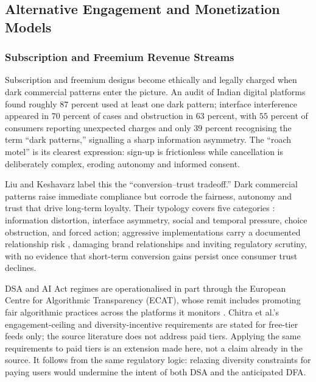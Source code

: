 \documentclass[11pt]{article}
\begin{document}
\subsection{Alternative Engagement and Monetization Models}

\subsubsection{Subscription and Freemium Revenue Streams}
\label{sec:subscription_freemium_streams} Subscription and freemium designs become ethically and legally charged when dark commercial patterns enter the picture. An audit of Indian digital platforms found \parencites[2]{6295677} roughly $87$ percent used at least one dark pattern; interface interference appeared in $70$ percent of cases and obstruction in $63$ percent, with $55$ percent of consumers reporting unexpected charges and only $39$ percent recognising the term ``dark patterns,'' signalling a sharp information asymmetry. The ``roach motel'' is its clearest expression: sign-up is frictionless \parencites[4]{6295677} while cancellation is deliberately complex, eroding autonomy and informed consent.

Liu and Keshavarz label this the ``conversion--trust tradeoff.'' Dark commercial patterns raise immediate compliance but corrode the fairness, autonomy and trust that drive long-term loyalty. Their typology covers five categories \parencites[33]{6087241}: information distortion, interface asymmetry, social and temporal pressure, choice obstruction, and forced action; aggressive implementations carry a documented relationship risk \parencites[35]{6087241}, damaging brand relationships and inviting regulatory scrutiny, with no evidence that short-term conversion gains persist once consumer trust declines.

DSA and AI Act regimes are operationalised in part through the European Centre for Algorithmic Transparency (ECAT), whose remit includes promoting fair algorithmic practices across the platforms it monitors \parencites[3]{5142478}. Chitra et al.'s engagement-ceiling and diversity-incentive requirements \parencites[2252]{6502223} are stated for free-tier feeds only; the source literature does not address paid tiers. Applying the same requirements to paid tiers is an extension made here, not a claim already in the source. It follows from the same regulatory logic: relaxing diversity constraints for paying users would undermine the intent of both DSA and the anticipated DFA.
\end{document}
